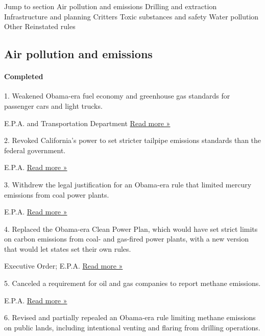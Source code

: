 Jump to section Air pollution and emissions Drilling and extraction
Infrastructure and planning Critters Toxic substances and safety Water
pollution Other Reinstated rules

\hypertarget{air-pollution-and-emissions}{%
\subsection{Air pollution and
emissions}\label{air-pollution-and-emissions}}

\hypertarget{completed}{%
\paragraph{Completed}\label{completed}}

1. Weakened Obama-era fuel economy and greenhouse gas standards for
passenger cars and light trucks.

 E.P.A. and Transportation Department \textbar{}
\href{https://www.nytimes3xbfgragh.onion/2020/03/30/climate/trump-fuel-economy.html}{Read
more »}

2. Revoked California's power to set stricter tailpipe emissions
standards than the federal government.

 E.P.A. \textbar{}
\href{https://www.nytimes3xbfgragh.onion/2019/09/17/climate/trump-california-emissions-waiver.html}{Read
more »}

3. Withdrew the legal justification for an Obama-era rule that limited
mercury emissions from coal power plants.

 E.P.A. \textbar{}
\href{https://www.nytimes3xbfgragh.onion/2020/04/16/climate/epa-mercury-coal.html}{Read
more »}

4. Replaced the Obama-era Clean Power Plan, which would have set strict
limits on carbon emissions from coal- and gas-fired power plants, with a
new version that would let states set their own rules.

 Executive Order; E.P.A. \textbar{}
\href{https://www.nytimes3xbfgragh.onion/2019/06/19/climate/epa-coal-emissions.html}{Read
more »}

5. Canceled a requirement for oil and gas companies to report methane
emissions.

 E.P.A. \textbar{}
\href{https://www.epa.gov/newsreleases/epa-withdraws-information-request-oil-and-gas-industry}{Read
more »}

6. Revised and partially repealed an Obama-era rule limiting methane
emissions on public lands, including intentional venting and flaring
from drilling operations.

